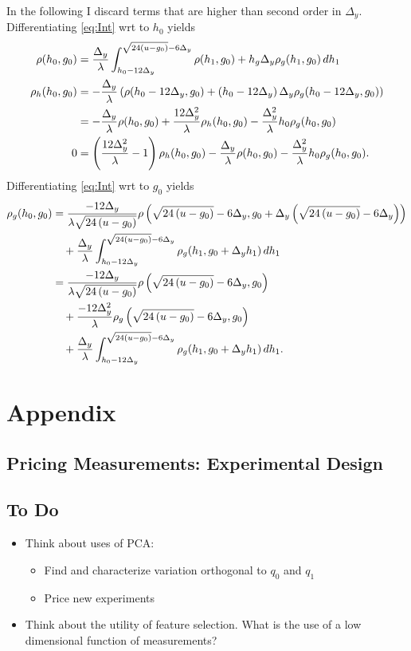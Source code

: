 \documentclass[]{article}
\begin{document}
In the following I discard terms that are higher than second order in
$\Delta_y$.  Differentiating \eqref{eq:Int}  wrt to $h_0$ yields 
\begin{align*}
  \rho(h_0,g_0) &= \frac{\Delta_y}{\lambda} \int_{h_0 - 12 \Delta_y}^{\sqrt{24(u-g_0)} - 6 \Delta_y}
  \rho(h_1, g_0)  + h_g \Delta_y \rho_g(h_1, g_0) \, dh_1 \\
  \rho_h(h_0, g_0) &= - \frac{\Delta_y}{\lambda} \left( \rho(h_0
    -12\Delta_y, g_0) + \left(h_0 - 12\Delta_y \right) \Delta_y \rho_g
    ( h_0 - 12\Delta_y, g_0) \right) \\
  &= - \frac{\Delta_y}{\lambda} \rho( h_0, g_0) + \frac{12
    \Delta^2_y}{\lambda} \rho_h( h_0, g_0) -
  \frac{\Delta^2_y}{\lambda} h_0 \rho_g(h_0, g_0) \\
  0 &= \left( \frac{12 \Delta^2_y}{\lambda} - 1 \right) \rho_h( h_0, g_0)
  - \frac{\Delta_y}{\lambda} \rho( h_0, g_0) -
  \frac{\Delta^2_y}{\lambda} h_0 \rho_g(h_0, g_0).
\end{align*}
Differentiating \eqref{eq:Int}  wrt to $g_0$ yields 
\begin{align*}
  \rho_g(h_0, g_0) %
  &= \frac{-12 \Delta_y} {\lambda \Rad{-g_0}}
  \rho\left( \Rad{-g_0} - 6\Delta_y, g_0  +\Delta_y \left( \Rad{-g_0}
      - 6 \Delta_y \right) \right) \\
  & \quad + \frac{\Delta_y}{\lambda} \int\RANGE \rho_g(h_1, g_0 +
  \Delta_y h_1) \, dh_1 \\
  &= \frac{-12 \Delta_y} {\lambda \Rad{-g_0}}
  \rho\left( \Rad{-g_0} -6\Delta_y, g_0  \right) \\
  & \quad + \frac{-12 \Delta^2_y} {\lambda}
  \rho_g\left( \Rad{-g_0} -6\Delta_y, g_0  \right) \\
  & \quad + \frac{\Delta_y}{\lambda} \int\RANGE \rho_g(h_1, g_0 +
  \Delta_y h_1) \, dh_1.
\end{align*}

\section{Appendix}
\label{sec:appendix}
 
\subsection{Pricing Measurements: Experimental Design}
\label{sec:pricing}

\subsection{To Do}
\begin{itemize}
\item Think about uses of PCA:
  \begin{itemize}
  \item Find and characterize variation orthogonal to $q_0$ and $q_1$
  \item Price new experiments
  \end{itemize}
\item Think about the utility of feature selection.  What is the use
  of a low dimensional function of measurements?
\end{itemize}
\end{document}
